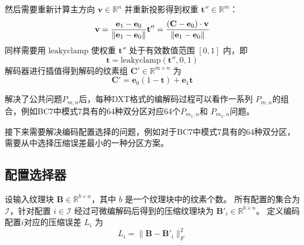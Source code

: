 然后需要重新计算主方向 $\mathbf{v}\in\mathbb{R}^n$ 并重新投影得到权重 $\mathbf{t}''\in\mathbb{R}^m$：
\begin{equation}
\mathbf{v}=\frac{\mathbf{e}_1-\mathbf{e}_0}{\|\mathbf{e}_1-\mathbf{e}_0\|}\\
\mathbf{t}''=\frac{(\mathbf{C}-\mathbf{e}_0)\cdot\mathbf{v}}{\|\mathbf{e}_1-\mathbf{e}_0\|}
\end{equation}
同样需要用 $\text{leakyclamp}$ 使权重 $\mathbf{t}''$ 处于有效数值范围 $[0,1]$ 内，即
\begin{equation}
\mathbf{t}=\text{leakyclamp}(\mathbf{t}'',0,1)
\end{equation}
解码器进行插值得到解码的纹素组 $\mathbf{C}'\in\mathbb{R}^{m\times n}$ 为
\begin{equation}
\mathbf{C}'=\mathbf{e}_0(1-\mathbf{t})+\mathbf{e}_1\mathbf{t}
\end{equation}

解决了公共问题$P_{m,n}$后，每种DXT格式的编解码过程可以看作一系列
$P_{m,n}$的组合，例如BC7中模式7具有的64种双分区对应64个$P_{m_1,n}$和
$P_{m_2,n}$问题。

接下来需要解决编码配置选择的问题，例如对于BC7中模式7具有的64种双分区，
需要从中选择压缩误差最小的一种分区方案。

\subsection{配置选择器}

设输入纹理块 $\mathbf{B}\in\mathbb{R}^{b\times n}$，其中 $b$ 是一个纹理块中的纹素个数。
所有配置的集合为 $\mathcal{I}$，针对配置 $i\in\mathcal{I}$ 经过可微编解码后得到的压缩纹理块为 $\mathbf{B}'_i\in\mathbb{R}^{b\times n}$。
定义编码配置$i$对应的压缩误差 $L_i$ 为
\begin{equation}
L_i=\|\mathbf{B}-\mathbf{B}'_i\|_F^2
\end{equation}

